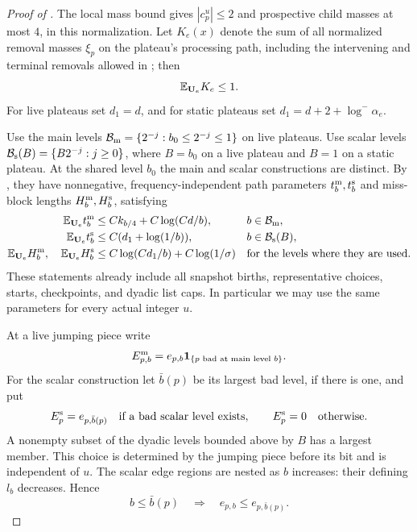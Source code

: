 \begin{proof}[Proof of ]
The local mass bound gives $|c_p^u|\le2$ and prospective child masses
at most $4$, in this normalization.  Let $K_e(x)$ denote the sum of all
normalized removal masses $\xi_p$ on the plateau's processing path,
including the intervening and terminal removals allowed in
; then
\begin{equation}\label{eq:09-kills}
 \mathbb E_{\mathbf U_e}K_e\le1.
\end{equation}
For live plateaus set $d_1=d$, and for static plateaus set
$d_1=d+2+\log^-\alpha_e$.

Use the main levels
$\mathcal B_{\rm m}=\{2^{-j}:b_0\le2^{-j}\le1\}$ on live plateaus.
Use scalar levels
$\mathcal B_{\rm s}(B)=\{B2^{-j}:j\ge0\}$, where $B=b_0$ on a live
plateau and $B=1$ on a static plateau.  At the shared level $b_0$ the
main and scalar constructions are distinct.  By
, they have nonnegative, frequency-independent
path parameters $t_b^{\rm m},t_b^{\rm s}$ and miss-block lengths
$H_b^{\rm m},H_b^{\rm s}$, satisfying
\begin{align}
 \mathbb E_{\mathbf U_e}t_b^{\rm m}
   &\le C k_{b/4}+C\log(Cd/b),
       &&b\in\mathcal B_{\rm m},\label{eq:09-main-parameters}\\
 \mathbb E_{\mathbf U_e}t_b^{\rm s}
   &\le C(d_1+\log(1/b)),
       &&b\in\mathcal B_{\rm s}(B),\label{eq:09-scalar-parameters}\\
 \mathbb E_{\mathbf U_e}H_b^{\rm m},\quad
 \mathbb E_{\mathbf U_e}H_b^{\rm s}
   &\le C\log(Cd_1/b)+C\log(1/\sigma)
       &&\text{for the levels where they are used.}
       \label{eq:09-miss-parameters}
\end{align}
These statements already include all snapshot births, representative
choices, starts, checkpoints, and dyadic list caps.  In particular we may
use the same parameters for every actual integer $u$.

At a live jumping piece write
\[
 E_{p,b}^{\rm m}=e_{p,b}\mathbf1_{\{p\text{ bad at main level }b\}}.
\]
For the scalar construction let $\bar b(p)$ be its largest bad level,
if there is one, and put
\[
 E_p^{\rm s}=e_{p,\bar b(p)}
 \quad\text{if a bad scalar level exists},\qquad E_p^{\rm s}=0
 \quad\text{otherwise}.
\]
A nonempty subset of the dyadic levels bounded above by $B$ has a
largest member.  This choice is determined by the jumping piece before
its bit and is independent of $u$.  The scalar edge regions are nested
as $b$ increases: their defining $l_b$ decreases.  Hence
\begin{equation}\label{eq:09-edge-monotonicity}
 b\le\bar b(p)\quad\Longrightarrow\quad e_{p,b}\le e_{p,\bar b(p)}.
\end{equation}


\end{proof}
